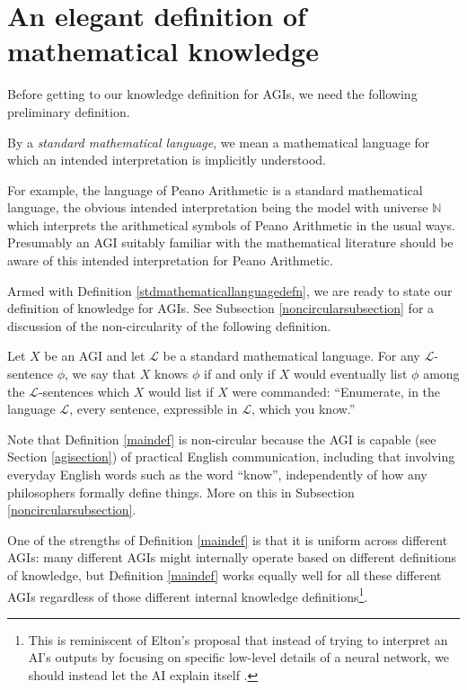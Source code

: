 \documentclass[runningheads]{llncs}
\begin{document}
\section{An elegant definition of mathematical knowledge}
\label{mainsection}

Before getting to our knowledge definition for AGIs, we need the following
preliminary definition.

\begin{definition}
\label{stdmathematicallanguagedefn}
By a \emph{standard mathematical language}, we mean a mathematical language for which an
intended interpretation is implicitly understood.
\end{definition}

For example, the
language of Peano Arithmetic is a standard mathematical language, the obvious
intended interpretation being the model with universe $\mathbb N$ which
interprets the arithmetical symbols of Peano Arithmetic in the usual ways.
Presumably an AGI suitably familiar with the mathematical literature should
be aware of this intended interpretation for Peano Arithmetic.

Armed with Definition \ref{stdmathematicallanguagedefn}, we are ready to state
our definition of knowledge for AGIs.
See Subsection \ref{noncircularsubsection} for a discussion of the non-circularity
of the following definition.

\begin{definition}
\label{maindef}
  Let $X$ be an AGI and let $\mathscr L$ be a standard mathematical language.
  For any $\mathscr L$-sentence $\phi$, we say that $X$
  knows $\phi$ if and only
  if $X$ would eventually list $\phi$ among the $\mathscr L$-sentences which $X$
  would list if $X$ were commanded:
  ``Enumerate, in the language $\mathscr L$, every sentence,
  expressible in $\mathscr L$, which you know.''
\end{definition}

Note that Definition \ref{maindef} is non-circular because
the AGI is capable (see Section \ref{agisection}) of practical English
communication, including that involving everyday English words such as
the word ``know'', independently of how any philosophers formally
define things. More on this in Subsection \ref{noncircularsubsection}.

One of the strengths of Definition \ref{maindef} is that it is uniform across
different AGIs: many different AGIs might internally operate based on different
definitions of knowledge, but Definition \ref{maindef} works equally well for
all these different AGIs regardless of those different internal knowledge
definitions\footnote{This is reminiscent of Elton's proposal that instead of
trying to interpret an AI's outputs by focusing on specific low-level details
of a neural network, we should instead let the AI explain itself \cite{elton}.}.
\end{document}
